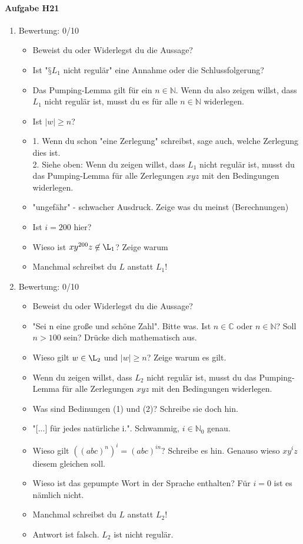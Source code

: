 \documentclass[11pt]{article}
\begin{document}
\paragraph{Aufgabe H21}
\begin{enumerate}[label=\alph*)]
\item Bewertung: 0/10
\begin{itemize}
\item Beweist du oder Widerlegst du die Aussage?
\item Ist "$§L_1$ nicht regulär" eine Annahme oder die Schlussfolgerung?
\item Das Pumping-Lemma gilt für ein $n\in\mathbb{N}$. Wenn du also zeigen willst, dass $L_1$ nicht regulär ist, musst du es für alle $n\in\mathbb{N}$ widerlegen.
\item Ist $\vert w \vert \geq n$?
\item 1. Wenn du schon "eine Zerlegung" schreibst, sage auch, welche Zerlegung dies ist.\\2. Siehe oben: Wenn du zeigen willst, dass $L_1$ nicht regulär ist, musst du das Pumping-Lemma für alle Zerlegungen $xyz$ mit den Bedingungen widerlegen.
\item "ungefähr" - schwacher Ausdruck. Zeige was du meinst (Berechnungen)
\item Ist $i=200$ hier?
\item Wieso ist $xy^{200}z\not\in\L_1$? Zeige warum
\item Manchmal schreibst du $L$ anstatt $L_1$!
\end{itemize}

\item Bewertung: 0/10
\begin{itemize}
\item Beweist du oder Widerlegst du die Aussage?
\item "Sei n eine große und schöne Zahl". Bitte was. Ist $n\in\mathbb{C}$ oder $n\in\mathbb{N}$? Soll $n>100$ sein? Drücke dich mathematisch aus.
\item Wieso gilt $w\in\L_2$ und $\vert w \vert \geq n$? Zeige warum es gilt.
\item Wenn du zeigen willst, dass $L_2$ nicht regulär ist, musst du das Pumping-Lemma für alle Zerlegungen $xyz$ mit den Bedingungen widerlegen.
\item Was sind Bedinungen (1) und (2)? Schreibe sie doch hin.
\item "[...] für jedes natürliche i.". Schwammig, $i\in\mathbb{N}_0$ genau.
\item Wieso gilt $((abc)^n)^i=(abc)^{in}$? Schreibe es hin. Genauso wieso $xy^iz$ diesem gleichen soll.
\item Wieso ist das gepumpte Wort in der Sprache enthalten? Für $i=0$ ist es nämlich nicht.
\item Manchmal schreibst du $L$ anstatt $L_2$!
\item Antwort ist falsch. $L_2$ ist nicht regulär.
\end{itemize}


\end{enumerate}
\end{document}
